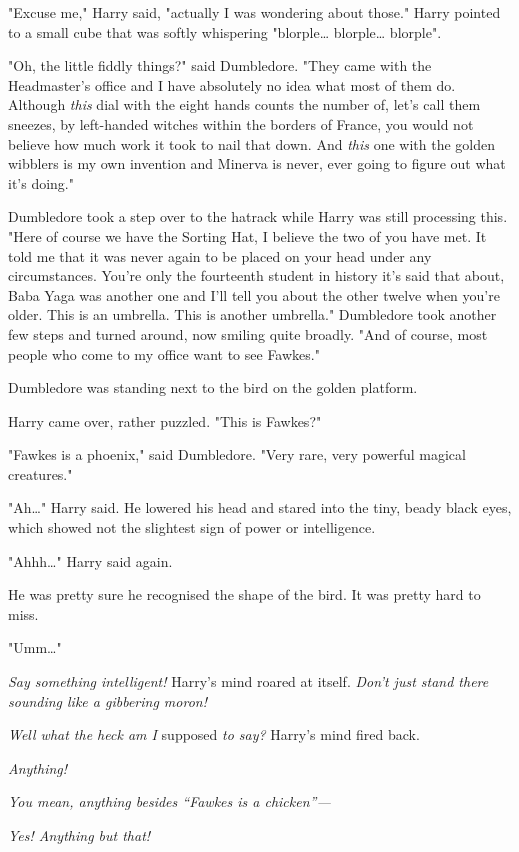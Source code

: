 "Excuse me," Harry said, "actually I was wondering about those." Harry pointed
to a small cube that was softly whispering "blorple{\ldots} blorple{\ldots}
blorple".

"Oh, the little fiddly things?" said Dumbledore. "They came with the
Headmaster's office and I have absolutely no idea what most of them do.
Although \emph{this} dial with the eight hands counts the number of, let's call
them sneezes, by left-handed witches within the borders of France, you would
not believe how much work it took to nail that down. And \emph{this} one with
the golden wibblers is my own invention and Minerva is never, ever going to
figure out what it's doing."

Dumbledore took a step over to the hatrack while Harry was still processing
this. "Here of course we have the Sorting Hat, I believe the two of you have
met. It told me that it was never again to be placed on your head under any
circumstances. You're only the fourteenth student in history it's said that
about, Baba Yaga was another one and I'll tell you about the other twelve when
you're older. This is an umbrella. This is another umbrella." Dumbledore took
another few steps and turned around, now smiling quite broadly. "And of course,
most people who come to my office want to see Fawkes."

Dumbledore was standing next to the bird on the golden platform.

Harry came over, rather puzzled. "This is Fawkes?"

"Fawkes is a phoenix," said Dumbledore. "Very rare, very powerful magical
creatures."

"Ah{\ldots}" Harry said. He lowered his head and stared into the tiny, beady
black eyes, which showed not the slightest sign of power or intelligence.

"Ahhh{\ldots}" Harry said again.

He was pretty sure he recognised the shape of the bird. It was pretty hard to
miss.

"Umm{\ldots}"

\emph{Say something intelligent!} Harry's mind roared at itself. \emph{Don't
just stand there sounding like a gibbering moron!}

\emph{Well what the heck am I} supposed \emph{to say?} Harry's mind fired back.

\emph{Anything!}

\emph{You mean, anything besides ``Fawkes is a chicken''---}

\emph{Yes! Anything but that!}

